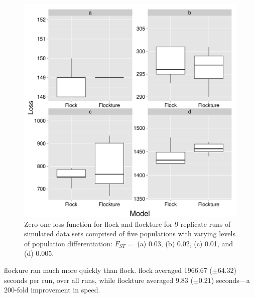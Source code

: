 \begin{figure}
\begin{center}
  \includegraphics[width=.9\linewidth]{images/Figures-Pat/FlockvFlocktureLoss.pdf}
  \caption{Zero-one loss function for {\sc flock} and {\sc flockture} for 9 replicate 
  runs of simulated data sets comprised of five populations with varying
  levels of population differentiation:  $F_{ST} = $ (a) 0.03, (b) 0.02, (c) 0.01, and (d) 0.005.}
  \label{fig:FvFloss}
\end{center}
\end{figure}

{\sc flockure} ran much more quickly than {\sc flock}.  {\sc flock} 
averaged 1966.67 ($\pm 64.32$) seconds per run,
over all runs, while {\sc flockture} averaged 9.83 ($\pm 0.21$) seconds---a 200-fold improvement in 
speed. 


